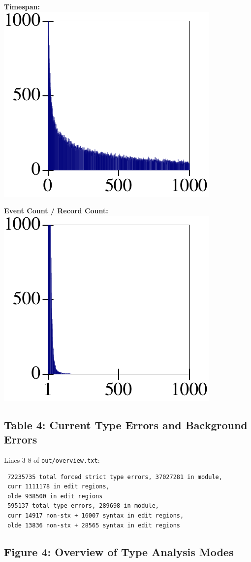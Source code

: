 \documentclass{article}
\begin{document}
\begin{minipage}{0.5\columnwidth}
  \textbf{Timespan:}\\
  \includegraphics[width=0.4\columnwidth]{out/timespan-distribution.pdf}
\end{minipage}\begin{minipage}{0.5\columnwidth}
  \textbf{Event Count / Record Count:}\\
  \includegraphics[width=0.4\columnwidth]{out/event-count-distribution.pdf}
\end{minipage}


\subsection*{Table 4: Current Type Errors and Background Errors}

Lines 3-8 of \texttt{out/overview.txt}:

\begin{verbatim}
 72235735 total forced strict type errors, 37027281 in module,
 curr 1111178 in edit regions,
 olde 938500 in edit regions
 595137 total type errors, 289698 in module,
 curr 14917 non-stx + 16007 syntax in edit regions,
 olde 13836 non-stx + 28565 syntax in edit regions
\end{verbatim}


\subsection*{Figure 4: Overview of Type Analysis Modes}
\end{document}
